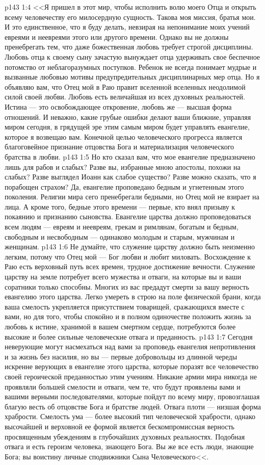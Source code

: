 \vs p143 1:4 <<Я пришел в этот мир, чтобы исполнить волю моего Отца и открыть всему человечеству его милосердную сущность. Такова моя миссия, братья мои. И это единственное, что я буду делать, невзирая на непонимание моих учений евреями и неевреями этого или другого времени. Однако вы не должны пренебрегать тем, что даже божественная любовь требует строгой дисциплины. Любовь отца к своему сыну зачастую вынуждает отца удерживать свое беспечное потомство от неблагоразумных поступков. Ребенок не всегда понимает мудрые и вызванные любовью мотивы предупредительных дисциплинарных мер отца. Но я объявляю вам, что Отец мой в Раю правит вселенной вселенных неодолимой силой своей любви. Любовь есть величайшая из всех духовных реальностей. Истина --- это освобождающее откровение, любовь же --- высшая форма отношений. И неважно, какие грубые ошибки делают ваши ближние, управляя миром сегодня, в грядущей эре этим самым миром будет управлять евангелие, которое я возвещаю вам. Конечной целью человеческого прогресса является благоговейное признание отцовства Бога и материализация человеческого братства в любви.
\vs p143 1:5 Но кто сказал вам, что мое евангелие предназначено лишь для рабов и слабых? Разве вы, избранные мною апостолы, похожи на слабых? Разве выглядел Иоанн как слабое существо? Разве можно сказать, что я порабощен страхом? Да, евангелие проповедано бедным и угнетенным этого поколения. Религии мира сего пренебрегали бедными, но Отец мой не взирает на лица. А кроме того, бедные этого времени --- первые, кто внял призыву к покаянию и признанию сыновства. Евангелие царства должно проповедоваться всем людям --- евреям и неевреям, грекам и римлянам, богатым и бедным, свободным и несвободным --- одинаково молодым и старым, мужчинам и женщинам.
\vs p143 1:6 Не думайте, что служение царству должно быть неизменно легким, потому что Отец мой --- Бог любви и любит миловать. Восхождение к Раю есть верховный путь всех времен, трудное достижение вечности. Служение царству на земле потребует всего мужества и отваги, на которые вы и ваши соратники только способны. Многих из вас предадут смерти за вашу верность евангелию этого царства. Легко умереть в строю на поле физической брани, когда ваша смелость укрепляется присутствием товарищей, сражающихся вместе с вами, но для того, чтобы спокойно и в полном одиночестве положить жизнь за любовь к истине, хранимой в вашем смертном сердце, потребуются более высокие и более сильные человеческие отвага и преданность.
\vs p143 1:7 Сегодня неверующие могут насмехаться над вами за проповедь евангелия непротивления и за жизнь без насилия, но вы --- первые добровольцы из длинной череды искренне верующих в евангелие этого царства, которые поразят все человечество своей героической преданностью этим учениям. Никакие армии мира никогда не проявляли большей смелости и отваги, чем те, что будут проявлены вами и вашими верными последователями, которые пойдут по всему миру, провозглашая благую весть об отцовстве Бога и братстве людей. Отвага плоти --- низшая форма храбрости. Смелость ума --- более высокий тип человеческой храбрости, однако высочайшей и верховной ее формой является бескомпромиссная верность просвященным убеждениям в глубочайших духовных реальностях. Подобная отвага и есть героизм человека, знающего Бога. Вы же все есть люди, знающие Бога; вы воистину личные сподвижники Сына Человеческого<<.
